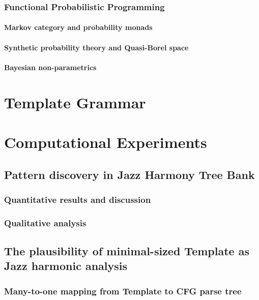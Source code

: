     \section{Functional Probabilistic Programming}
        \subsection{Markov category and probability monads}
        \subsection{Synthetic probability theory and Quasi-Borel space}
        \subsection{Bayesian non-parametrics}




%
\cleardoublepage
\part{Template Grammar}
% 


    

\cleardoublepage
\part{Computational Experiments}
\chapter{Pattern discovery in Jazz Harmony Tree Bank}
    \section{Quantitative results and discussion}
    \section{Qualitative analysis}
\chapter{The plausibility of minimal-sized Template as Jazz harmonic analysis}
    \section{Many-to-one mapping from Template to CFG parse tree}
